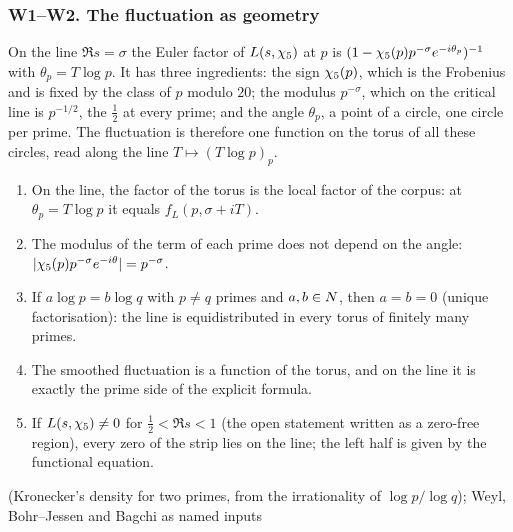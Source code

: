 \subsubsection{W1--W2. The fluctuation as geometry}\label{ssec:fluct-geometry}

On the line $\Re s=\sigma$ the Euler factor of $L(s,\chi_5)$ at $p$ is
$(1-\chi_5(p)p^{-\sigma}e^{-i\theta_p})^{-1}$ with $\theta_p=T\log p$.  It has three
ingredients: the sign $\chi_5(p)$, which is the Frobenius and is fixed by the class of $p$
modulo $20$; the modulus $p^{-\sigma}$, which on the critical line is $p^{-1/2}$, the $\tfrac12$
at every prime; and the angle $\theta_p$, a point of a circle, one circle per prime.  The
fluctuation is therefore one function on the torus of all these circles, read along the
line $T\mapsto(T\log p)_p$.

\begin{proposition}\label{prop:torus-line}
\begin{enumerate}[label=\textup{(\roman*)}]
  \item On the line, the factor of the torus is the local factor of the corpus:
    at $\theta_p=T\log p$ it equals $f_L(p,\sigma+iT)$.
  \item The modulus of the term of each prime does not depend on the angle:
    $|\chi_5(p)p^{-\sigma}e^{-i\theta}|=p^{-\sigma}$.
  \item If $a\log p=b\log q$ with $p\ne q$ primes and $a,b\in N$, then $a=b=0$ (unique
    factorisation): the line is equidistributed in every torus of finitely many primes.
  \item The smoothed fluctuation is a function of the torus, and on the line it is exactly
    the prime side of the explicit formula.
  \item If $L(s,\chi_5)\ne0$ for $\tfrac12<\Re s<1$ (the open statement written as a zero-free region), every zero of the strip lies on the line;
    the left half is given by the functional equation.
\end{enumerate}
{\raggedright \leavevmode{} (Kronecker's density for two primes, from the irrationality of $\log p/\log q$); Weyl, Bohr--Jessen and Bagchi as named inputs\par}
\end{proposition}

